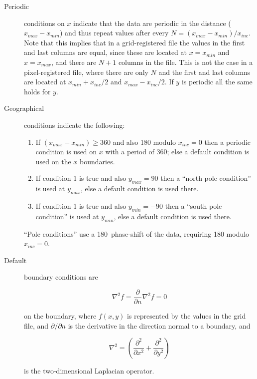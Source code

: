 \begin{description}

\item[Periodic] conditions on $x$ indicate that the data are
periodic in the distance ($x_{max} - x_{min}$) and thus repeat
values after every $N = (x_{max} - x_{min})/x_{inc}$.  Note that
this implies that in a grid-registered file the values in the first
and last columns are equal, since these are located at $x = x_{min}$
and $x = x_{max}$, and there are $N + 1$ columns in the file.
This is not the case in a pixel-registered file, where there are only
$N$ and the first and last columns are located at
$x_{min} + x_{inc}/2$ and $x_{max} - x_{inc}/2$.  If $y$ is
periodic all the same holds for $y$.

\item[Geographical] conditions indicate the following:

\begin{enumerate}

\item If $(x_{max} - x_{min}) \geq 360$ and also 180 modulo $x_{inc} = 0$
then a periodic condition is used on $x$ with a period of 360;
else a default condition is used on the $x$ boundaries.

\item If condition 1 is true and also $y_{max} = 90$ then a
``north pole condition'' is used at $y_{max}$, else a default
condition is used there.

\item If condition 1 is true and also $y_{min} = -90$ then a
``south pole condition'' is used at $y_{min}$, else a default
condition is used there.

\end{enumerate} 

``Pole conditions'' use a 180\DS\ phase-shift of the data,
requiring 180 modulo $x_{inc} = 0$.

\item[Default] boundary conditions are

\[ \nabla^2 f = \frac{\partial}{\partial n} \nabla^2 f = 0 \] 

on the boundary, where $f(x, y)$ is represented by the values in
the grid file, and $\partial/\partial n$ is the derivative in the direction normal to a
boundary, and

\[ \nabla^2 = \left(\frac{\partial^2}{\partial x^2} + \frac{\partial^2}{\partial y^2}\right) \]

is the two-dimensional Laplacian operator.

\end{description}

